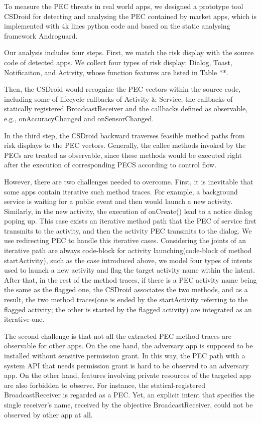 \documentclass{sig-alternate-05-2015}
\begin{document}
To measure the PEC threats in real world apps, we designed a prototype tool CSDroid for detecting and analysing the PEC contained by market apps, which is implemented with 4k lines python code and based on the static analysing framework Androguard\cite{desnos2013androguard}. 

Our analysis includes four steps. 
First, we match the risk display with the source code of detected apps. We collect four types of risk display: Dialog, Toast, Notificaiton, and Activity, whose function features are listed in Table **. 

Then, the CSDroid would recognize the PEC vectors within the source code, including some of lifecycle callbacks of Activity \& Service, the callbacks of statically registered BroadcastReceiver and the callbacks defined as observable, e.g., onAccuracyChanged and onSensorChanged.

In the third step, the CSDroid backward traverses feasible method paths from risk displays to the PEC vectors. Generally, the callee methods invoked by the PECs are treated as observable, since these methods would be executed right after the execution of corresponding PECS according to control flow.

However, there are two challenges needed to overcome. 
First, it is inevitable that some apps contain iterative such method traces. For example, a background service is waiting for a public event and then would launch a new activity. Similarly, in the new activity, the execution of onCreate() lead to a notice dialog poping up. This case exists an iterative method path that the PEC of service first transmits to the activity, and then the activity PEC transmits to the dialog. We use redirecting PEC to handle this iterative cases. Considering the joints of an iterative path are always code-block for activity launching(code-block of method startActivity), such as the case introduced above, we model four types of intents used to launch a new activity and flag the target activity name within the intent. After that, in the rest of the method traces, if there is a PEC activity name being the same as the flagged one, the CSDroid associates the two methods, and as a result, the two method traces(one is ended by the startActivity referring to the flagged activity; the other is started by the flagged activity) are integrated as an iterative one.

The second challenge is that not all the extracted PEC method traces are observable for other apps.
On the one hand, the adversary app is supposed to be installed without sensitive permission grant. In this way, the PEC path with a system API that needs permission grant is hard to be observed to an adversary app. On the other hand, features involving private resources of the targeted app are also forbidden to observe. For instance, the statical-registered BroadcastReceiver is regarded as a PEC. Yet, an explicit intent that specifies the single receiver's name, received by the objective BroadcastReceiver, could not be observed by other app at all.
\end{document}
